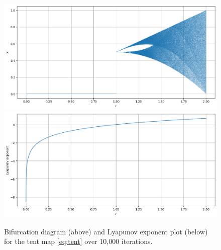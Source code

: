 \begin{exmp}
    \begin{figure}
        \centering
        \includegraphics[width=\linewidth]{Bifurcation Images/bifurcation_tent.png}
        \includegraphics[width=\linewidth]{Bifurcation Images/lypaunov_tent.png}
        \caption{Bifurcation diagram (above) and Lyapunov exponent plot (below) for the tent map \eqref{eq:tent} over 10,000 iterations.}
        \label{fig:lyapunov_tent}
    \end{figure}
\end{exmp}

